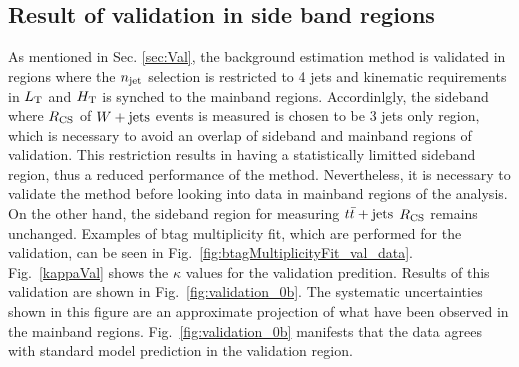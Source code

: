 \subsection{Result of validation in side band regions}
\label{sec:ResVal}
As mentioned in Sec. \ref{sec:Val}, the background estimation method is validated in regions where the $n_{\rm jet}$ selection is restricted to 4 jets and kinematic requirements in $L_{\rm T}$ and $H_{\rm T}$ is synched to the mainband regions.
Accordinlgly, the sideband where $R_{\rm CS}$ of $W+\textrm{jets}$ events is measured is chosen to be 3 jets only region, which is necessary to avoid an overlap of sideband and mainband regions of validation.
This restriction results in having a statistically limitted sideband region, thus a reduced performance of the method.
Nevertheless, it is necessary to validate the method before looking into data in mainband regions of the analysis. 
On the other hand, the sideband region for measuring $t\bar{t}+\textrm{jets}$ $R_{\rm CS}$ remains unchanged.
Examples of btag multiplicity fit, which are performed for the validation, can be seen in Fig.~\ref{fig:btagMultiplicityFit_val_data}. 
Fig.~\ref{kappaVal} shows the $\kappa$ values for the validation predition.
Results of this validation are shown in Fig.~\ref{fig:validation_0b}.
The systematic uncertainties shown in this figure are an approximate projection of what have been observed in the mainband regions.
Fig.~\ref{fig:validation_0b} manifests that the data agrees with standard model prediction in the validation region.
